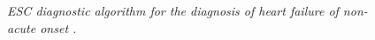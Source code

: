 \begin{figure}
\begin{tikzpicture}[x=0.75pt,y=0.75pt,yscale=-1,xscale=1]
\end{tikzpicture}

\caption[ESC diagnostic algorithm of heart failure]{\textit{ESC diagnostic algorithm for the diagnosis of heart failure of non-acute onset \cite[page.~2141]{ponikowski2016}.}}
\label{fig:esc_algo_hf}
\normalsize
\end{figure}